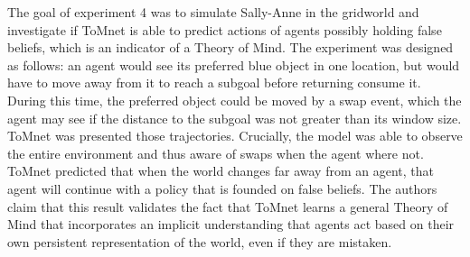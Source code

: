 \documentclass[twocolumn,superscriptaddress,aps]{revtex4-1}
\begin{document}
The goal of experiment 4 was to simulate Sally-Anne in the gridworld and investigate if ToMnet is able to predict actions of agents possibly holding false beliefs, which is an indicator of a Theory of Mind. The experiment was designed as follows: an agent would see its preferred blue object in one location, but would have to move away from it to reach a subgoal before returning consume it. During this time, the preferred object could be moved by a swap event, which the agent may see if the distance to the subgoal was not greater than its window size. ToMnet was presented those trajectories. Crucially, the model was able to observe the entire environment and thus aware of swaps when the agent where not. ToMnet predicted that when the world changes far away from an agent, that agent will continue with a policy that is founded on false beliefs. The authors claim that this result validates the fact that ToMnet learns a general Theory of Mind that incorporates an implicit understanding that agents act based on their own persistent representation of the world, even if they are mistaken. \\
\end{document}
